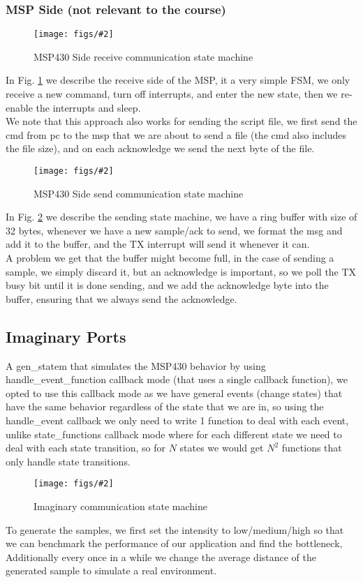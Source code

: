 \documentclass{article}
\newcommand{\myfig}[4]{
\begin{figure}[h]
    \centering
    \captionsetup{justification=centering}
    \texttt{[image: figs/\#2]}
    \caption{#3}
    \label{fig:#4}
\end{figure}
}
\newcommand{\reff}[1]{Fig. \ref{fig:#1}}
\begin{document}
\subsubsection{MSP Side (not relevant to the course)}
\myfig{0.5}{Communication-msp430.drawio.png}{MSP430 Side receive communication state machine}{msps1}

In \reff{msps1} we describe the receive side of the MSP, it a very simple FSM, we only receive a new command, turn off interrupts, and enter the new state, then we re-enable the interrupts and sleep.\\
We note that this approach also works for sending the script file, we first send the cmd from pc to the msp that we are about to send a file (the cmd also includes the file size), and on each acknowledge we send the next byte of the file.
\myfig{0.5}{Communication-tx.png}{MSP430 Side send communication state machine}{msps2}

In \reff{msps2} we describe the sending state machine, we have a ring buffer with size of 32 bytes, whenever we have a new sample/ack to send, we format the msg and add it to the buffer, and the TX interrupt will send it whenever it can.\\
A problem we get that the buffer might become full, in the case of sending a sample, we simply discard it, but an acknowledge is important, so we poll the TX busy bit until it is done sending, and we add the acknowledge byte into the buffer, ensuring that we always send the acknowledge.

\subsection{Imaginary Ports}
A gen\_statem that simulates the MSP430 behavior by using handle\_event\_function callback mode (that uses a single callback function), we opted to use this callback mode as we have general events (change states) that have the same behavior regardless of the state that we are in, so using the handle\_event callback we only need to write 1 function to deal with each event, unlike state\_functions callback mode where for each different state we need to deal with each state transition, so for $N$ states we would get $N^2$ functions that only handle state transitions.

\myfig{0.9}{img_comm.png}{Imaginary communication state machine}{}

To generate the samples, we first set the intensity to low/medium/high so that we can benchmark the performance of our application and find the bottleneck, Additionally every once in a while we change the average distance of the generated sample to simulate a real environment.
\end{document}
